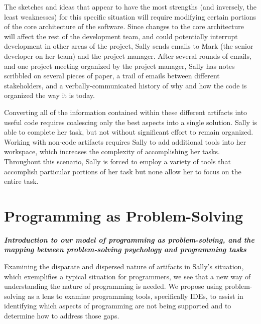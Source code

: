 \documentclass{ppig}
\newcommand{\bold}[1]{\textit{\textbf{\color{aoblue}#1}}} %
\begin{document}
The sketches and ideas that appear to have the most strengths (and inversely, the least weaknesses) for this specific situation will require modifying certain portions of the core architecture of the software.
Since changes to the core architecture will affect the rest of the development team, and could potentially interrupt development in other areas of the project, Sally sends emails to Mark (the senior developer on her team) and the project manager.
After several rounds of emails, and one project meeting organized by the project manager, Sally has notes scribbled on several pieces of paper, a trail of emails between different stakeholders, and a verbally-communicated history of why and how the code is organized the way it is today.

Converting all of the information contained within these different artifacts into useful code requires coalescing only the best aspects into a single solution.
Sally is able to complete her task, but not without significant effort to remain organized.
Working with non-code artifacts requires Sally to add additional tools into her workspace, which increases the complexity of accomplishing her tasks.
Throughout this scenario, Sally is forced to employ a variety of tools that accomplish particular portions of her task but none allow her to focus on the entire task.

\section{Programming as Problem-Solving}

\bold{Introduction to our model of programming as problem-solving, and the mapping between problem-solving psychology and programming tasks\\}

Examining the disparate and dispersed nature of artifacts in Sally's situation, which exemplifies a typical situation for programmers, we see that a new way of understanding the nature of programming is needed.
We propose using problem-solving as a lens to examine programming tools, specifically IDEs, to assist in identifying which aspects of programming are not being supported and to determine how to address those gaps.
\end{document}
